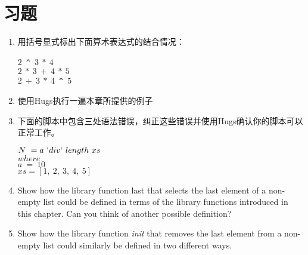\section{习题}

\begin{enumerate}
\item 用括号显式标出下面算术表达式的结合情况：

\noindent\hspace*{1cm} $2$~\verb|^|~$3~*~4$\\
\hspace*{1cm} $2~*~3~+~4~*~5$\\
\hspace*{1cm} $2~+~3~*~4$~\verb|^|~$5$

\item 使用Hugs执行一遍本章所提供的例子

\item
下面的脚本中包含三处语法错误，纠正这些错误并使用Hugs确认你的脚本可以正常工作。

\noindent\hspace*{1cm} $N~ = a~`div`~length~xs$\\
\hspace*{2cm} $       where$\\
\hspace*{3cm} $          a~=~10$\\
\hspace*{2.5cm} $        xs = [1,~2,~3,~4,~5]$

\item Show how the library function last that selects the last element of a
non-empty list could be defined in terms of the library functions introduced
in this chapter. Can you think of another possible definition?

\item Show how the library function \textit{init} that removes the last element from a
non-empty list could similarly be defined in two different ways.
\end{enumerate}
